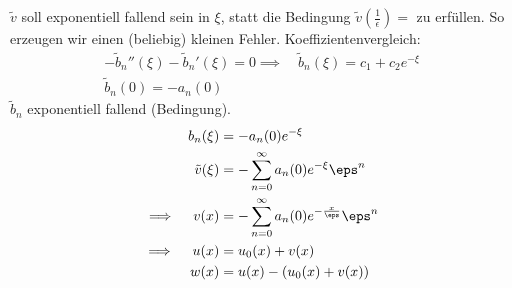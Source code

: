 \begin{beispiel*}
  $\tilde v$ soll exponentiell fallend sein in $\xi$, statt die Bedingung $\tilde v(\frac 1 \epsilon) = $ zu erfüllen. So erzeugen wir einen (beliebig) kleinen Fehler. Koeffizientenvergleich:
  \begin{align*}
    -\tilde b_{n}''(\xi) - \tilde b_{n}'(\xi) = 0 \implies \quad \tilde b_{n}(\xi) = c_{1} + c_{2}e^{-\xi}\\
    \tilde b_{n}(0) = - a_{n}(0)
  \end{align*}
  $\tilde b_{n}$ exponentiell fallend (Bedingung).
  \begin{align*}
    b_{n}(\xi) &= - a_{n}(0)e^{-\xi}\\
    \tilde v (\xi) &= - \sum_{n = 0}^{\infty}a_{n}(0) e^{-\xi} \eps^{n} \\
    \implies \quad v(x) &= - \sum_{n = 0}^{\infty} a_{n}(0) e^{- \frac x \eps} \eps^{n}\\
    \implies \quad u(x) &= u_{0}(x) + v(x)\\
    w(x) &= u(x) - (u_{0}(x) + v(x))
  \end{align*}
\end{beispiel*}


